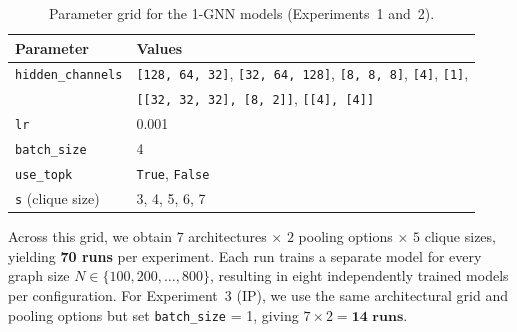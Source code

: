 \begin{table}[h]
\centering
\begin{tabular}{ll}
\toprule
\textbf{Parameter} & \textbf{Values} \\
\midrule
\texttt{hidden\_channels} 
& \texttt{[128, 64, 32]}, \texttt{[32, 64, 128]}, \texttt{[8, 8, 8]}, \texttt{[4]}, \texttt{[1]}, \\
& \texttt{[[32, 32, 32], [8, 2]]}, \texttt{[[4], [4]]} \\
\texttt{lr} & 0.001 \\
\texttt{batch\_size} & 4 \\
\texttt{use\_topk} & \texttt{True}, \texttt{False} \\
\texttt{s} (clique size) & 3, 4, 5, 6, 7 \\
\bottomrule
\end{tabular}
\caption{Parameter grid for the 1-GNN models (Experiments~1 and~2).}
\label{parameterTable}
\end{table}

Across this grid, we obtain $7$ architectures $\times$ $2$ pooling options $\times$ $5$ clique sizes, yielding \textbf{70 runs} per experiment. Each run trains a separate model for every graph size $N \in \{100, 200, \ldots, 800\}$, resulting in eight independently trained models per configuration. For Experiment~3 (IP), we use the same architectural grid and pooling options but set \texttt{batch\_size} = 1, giving $7 \times 2 = \textbf{14 runs}$.




